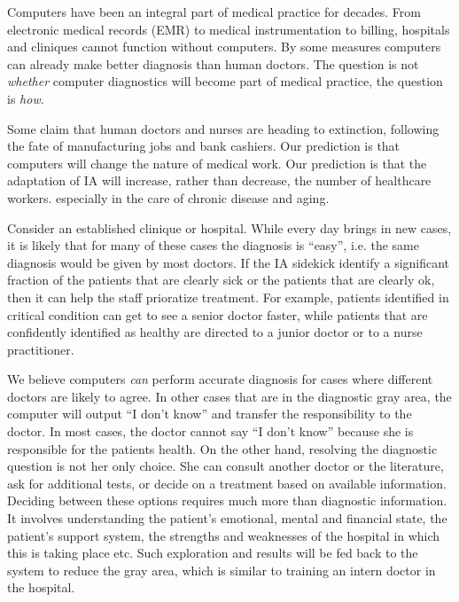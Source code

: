 \documentclass[11pt]{pnas-new}
\begin{document}
  Computers have been an integral part of medical practice for decades. From
  electronic medical records (EMR) to medical instrumentation to billing,
  hospitals and cliniques cannot function without computers. By some
  measures computers can already make better diagnosis than human
  doctors. The question is not {\em whether} computer diagnostics will
  become part of medical practice, the question is {\em how}.

  
  Some claim that human doctors and nurses are heading to extinction,
  following the fate of manufacturing jobs and bank cashiers.  Our
  prediction is that computers will change the nature of medical
  work. Our prediction is that the adaptation of IA will increase,
  rather than decrease, the number of healthcare workers. especially
  in the care of chronic disease and aging.

  Consider an established clinique or hospital. While every day brings
  in new cases, it is likely that for many of these cases the
  diagnosis is ``easy'', i.e. the same diagnosis would be given by
  most doctors. If the IA sidekick identify a significant fraction of
  the patients that are clearly sick or the patients that are clearly
  ok, then it can help the staff prioratize treatment. For example,
  patients identified in critical condition can get to see a senior
  doctor faster, while patients that are confidently identified as
  healthy are directed to a junior doctor or to a nurse practitioner.

  We believe computers {\em can} perform accurate diagnosis for cases where
  different doctors are likely to agree. In other cases {\color{blue}that are in the}
  diagnostic gray area, the computer will output ``I don't know'' and
  transfer the responsibility to the doctor. In most cases, the doctor
  cannot say ``I don't know'' because she is responsible for the
  patients health. On the other hand, resolving the diagnostic
  question is not her only choice. She can consult another doctor or
  the literature, ask for additional tests, or decide on a treatment
  based on available information. Deciding between these options requires much
  more than diagnostic information. It involves understanding the
  patient's emotional, mental and financial state, the patient's
  support system, the strengths and weaknesses of the hospital in
  which this is taking place etc. {\color{blue}Such exploration and results will be fed back to the system to reduce the gray area, which is similar to training an intern doctor in the hospital.}
\end{document}
